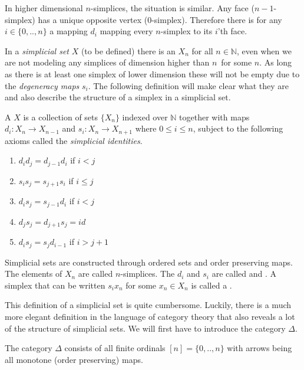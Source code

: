 \documentclass[../../main.tex]{subfiles}
\begin{document}
    In higher dimensional $n$-simplices, the situation is similar. Any face ($n-1$-simplex) has a unique opposite vertex ($0$-simplex). Therefore there is for any $i \in \{0,..,n\}$ a mapping $d_i$ mapping every $n$-simplex to its $i$'th face.

    In a \emph{simplicial set} $X$ (to be defined) there is an $X_n$ for all $n \in \mathbb{N}$, even when we are not modeling any simplices of dimension higher than $n$ for some $n$. As long as there is at least one simplex of lower dimension these will not be empty due to the \emph{degeneracy maps} $s_i$. The following definition will make clear what they are and also describe the structure of a simplex in a simplicial set.

    \begin{definition}\label{simplicial-set}
        A  $X$ is a collection of sets $\{X_n\}$ indexed over $\mathbb{N}$ together with maps $d_i: X_n \to X_{n-1}$ and $s_i: X_n\to X_{n+1}$ where $0 \leq i \leq n$, subject to the following axioms called the \emph{simplicial identities}.
        
        \begin{enumerate}
            \item $d_id_j = d_{j-1}d_i$ if $i < j$
            \item $s_is_j = s_{j+1}s_i$ if $i \leq j$
            \item $d_is_j = s_{j-1}d_i$ if $i < j$
            \item $d_js_j = d_{j+1}s_j = id$
            \item $d_is_j = s_jd_{i-1}$ if $i > j+1$
        \end{enumerate}
    \end{definition}
    Simplicial sets are constructed through ordered sets and order preserving maps. The elements of $X_n$ are called $n$-simplices. The $d_i$ and $s_i$ are called  and . A simplex that can be written $s_ix_n$ for some $x_n \in X_n$ is called a . 
    
    This definition of a simplicial set is quite cumbersome. Luckily, there is a much more elegant definition in the language of category theory that also reveals a lot of the structure of simplicial sets. We will first have to introduce the category $\Delta$.

    \begin{definition}
        The category $\Delta$ consists of all finite ordinals $[n] = \{0, .., n\}$ with arrows being all monotone (order preserving) maps.
    \end{definition}
\end{document}
